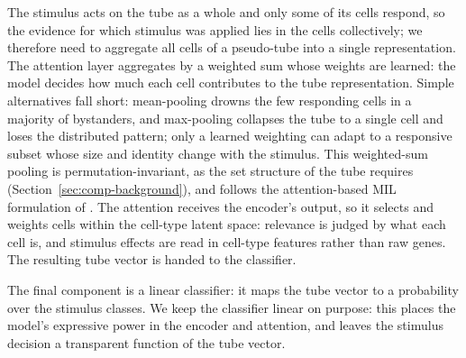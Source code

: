 \documentclass[11pt,a4paper]{article}
\begin{document}
The stimulus acts on the tube as a whole and only some of its cells respond, so the evidence for which stimulus was applied lies in the cells collectively; we therefore need to aggregate all cells of a pseudo-tube into a single representation.
The attention layer aggregates by a weighted sum whose weights are learned: the model decides how much each cell contributes to the tube representation.
Simple alternatives fall short: mean-pooling drowns the few responding cells in a majority of bystanders, and max-pooling collapses the tube to a single cell and loses the distributed pattern; only a learned weighting can adapt to a responsive subset whose size and identity change with the stimulus.
This weighted-sum pooling is permutation-invariant, as the set structure of the tube requires (Section~\ref{sec:comp-background}), and follows the attention-based MIL formulation of \citet{ilse2018attention}.
The attention receives the encoder's output, so it selects and weights cells within the cell-type latent space: relevance is judged by what each cell is, and stimulus effects are read in cell-type features rather than raw genes. The resulting tube vector is handed to the classifier.

The final component is a linear classifier: it maps the tube vector to a probability over the stimulus classes. We keep the classifier linear on purpose: this places the model's expressive power in the encoder and attention, and leaves the stimulus decision a transparent function of the tube vector.
\end{document}
